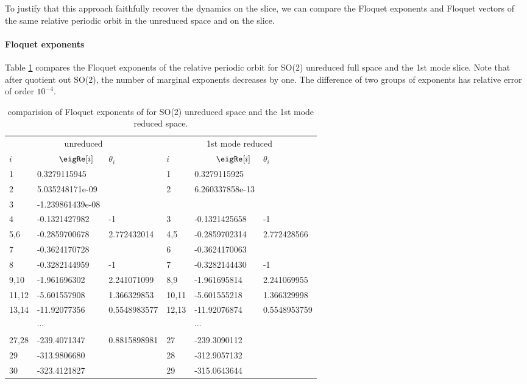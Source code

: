 To justify that this approach faithfully recover the dynamics on the slice,
we can compare the Floquet exponents and Floquet vectors of the same
relative periodic orbit  in the unreduced space and on the
slice.

\paragraph{Floquet exponents}
Table \ref{tab:floquetM1} compares the Floquet exponents of the relative periodic orbit
 for SO(2) unreduced full space and the 1st mode slice. Note that after
quotient out SO(2), the number of marginal exponents decreases by one. The difference
of two groups of exponents has relative error of order $10^{-4}$.

\begin{table}[H]
  \centering
  \begin{tabular}{l l l |l l l}
    \multicolumn{3}{c}{unreduced} & \multicolumn{3}{c}{1st mode reduced}\\
    $i$ & ~~~~~$\eigRe[i]$  & $\theta_{i}$  & $i$ & ~~~~~$\eigRe[i]$ & $\theta_{i}$  \\
    \hline
    1  &     0.3279115945    &               & 1  &   0.3279115925      &                \\
    2  &     5.035248171e-09 &               & 2  &   6.260337858e-13   &                \\
    3  &    -1.239861439e-08 &               &    &                                      \\
    4  &    -0.1321427982    &  -1           & 3  &   -0.1321425658     &  -1            \\
    5,6&    -0.2859700678    &  2.772432014  & 4,5&   -0.2859702314     &  2.772428566   \\
    7  &    -0.3624170728    &               & 6  &   -0.3624170063     &                \\
    8  &    -0.3282144959    &  -1           & 7  &   -0.3282144430     &  -1            \\
    9,10&   -1.961696302     &  2.241071099  & 8,9&   -1.961695814      &  2.241069955   \\
    11,12&  -5.601557908     &  1.366329853  &10,11&  -5.601555218      &  1.366329998   \\
    13,14&  -11.92077356     &  0.5548983577 &12,13&  -11.92076874      &  0.5548953759  \\
         &   $\cdots$        &               &    &  $\cdots$           &                \\
    27,28&  -239.4071347     &  0.8815898981 & 27 &   -239.3090112      &                \\
    29   &  -313.9806680     &               & 28 &   -312.9057132      &                \\
    30   &  -323.4121827     &               & 29 &   -315.0643644      &                \\
  \end{tabular}
  \caption{comparision of Floquet exponents of  for SO(2) unreduced space and
    the 1st mode reduced space. }
  \label{tab:floquetM1}
\end{table}
